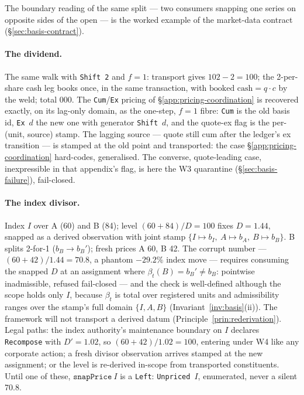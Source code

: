 \documentclass[11pt,a4paper]{article}
\newcommand{\EUR}[1]{\mbox{\texteuro#1}}
\begin{document}
\noindent The boundary reading of the same split --- two consumers snapping one
series on opposite sides of the open --- is the worked example of the market-data
contract (\S\ref{sec:basis-contract}).

\paragraph{The dividend.} The same walk with \texttt{Shift 2} and $f=1$: transport gives
$102-2=100$; the 2-per-share cash leg books once, in the same transaction, with
$\text{booked cash}=q\cdot c$ by the weld; total \EUR{102{,}000}. The
\texttt{Cum}/\texttt{Ex} pricing of \S\ref{app:pricing-coordination} is recovered exactly, on
its lag-only domain, as the one-step, $f=1$ fibre: \texttt{Cum} is the old basis id,
\texttt{Ex}~$d$ the new one with generator \texttt{Shift}~$d$, and the quote-ex flag is
the per-(unit, source) stamp. The lagging source --- quote still cum after the ledger's
ex transition --- is stamped at the old point and transported: the case
\S\ref{app:pricing-coordination} hard-codes, generalised. The converse, quote-leading
case, inexpressible in that appendix's flag, is here the W3 quarantine
(\S\ref{sec:basis-failure}), fail-closed.

\paragraph{The index divisor.} Index $I$ over A (60) and B (84); level $(60+84)/D=100$
fixes $D=1.44$, snapped as a derived observation with joint stamp
$\{I\mapsto b_I,\ A\mapsto b_A,\ B\mapsto b_B\}$. B splits 2-for-1 ($b_B\to b_B'$);
fresh prices A 60, B 42. The corrupt number --- $(60+42)/1.44=70.8$, a phantom
$-29.2\%$ index move --- requires consuming the snapped $D$ at an assignment where
$\beta_t(B)=b_B'\ne b_B$: pointwise inadmissible, refused fail-closed --- and the check
is well-defined although the scope holds only $I$, because $\beta_t$ is total over
registered units and admissibility ranges over the stamp's full domain $\{I,A,B\}$
(Invariant~\ref{inv:basis}(ii)). The framework will not transport a derived datum
(Principle~\ref{prin:rederivation}). Legal paths: the index authority's maintenance
boundary on $I$ declares \texttt{Recompose} with $D'=1.02$, so $(60+42)/1.02=100$,
entering under W4 like any corporate action; a fresh divisor observation arrives stamped
at the new assignment; or the level is re-derived in-scope from transported
constituents. Until one of these, $\texttt{snapPrice}\ I$ is a \texttt{Left}:
\texttt{Unpriced}~$I$, enumerated, never a silent 70.8.
\end{document}
